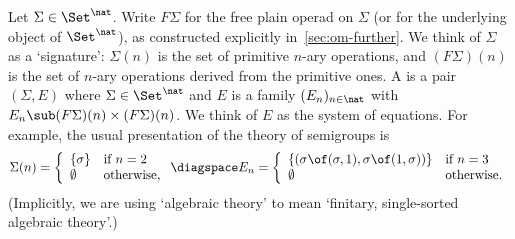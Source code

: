 Let $\Sigma \in \Set^\nat$.  Write $F\Sigma$ for the free plain operad on
$\Sigma$ (or for the underlying object of $\Set^\nat$), as constructed
explicitly in~\ref{sec:om-further}.  We think of $\Sigma$ as a
`signature':%
%
%
$\Sigma(n)$ is the set of primitive $n$-ary operations, and $(F\Sigma)(n)$
is the set of $n$-ary operations derived from the primitive ones.  A
%
%
%
is a pair
$(\Sigma, E)$ where $\Sigma \in \Set^\nat$ and $E$ is a family
$(E_n)_{n\in\nat}$ with $E_n \sub (F\Sigma)(n) \times (F\Sigma)(n)$.  We
think of $E$ as the system of equations.  For example, the usual
presentation of the theory of semigroups is
\[
\Sigma(n) = 
\left\{
\begin{array}{ll}
\{\sigma \}	&\textrm{if } n=2	\\
\emptyset	&\textrm{otherwise,}
\end{array}
\right.
%
\diagspace
%
E_n = 
\left\{
\begin{array}{ll}
\{ (\sigma\of(\sigma, 1), \sigma\of(1, \sigma)) \}&\textrm{if } n = 3	\\
\emptyset					&\textrm{otherwise.}	\\
\end{array}
\right.
\]
(Implicitly, we are using `algebraic theory'%
%
%
to mean `finitary,
single-sorted algebraic theory'.)

